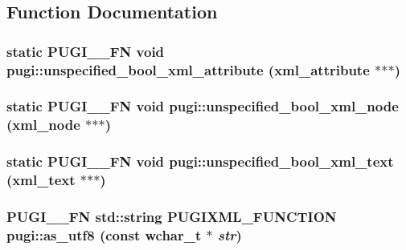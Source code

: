 \subsection{Function Documentation}
\hypertarget{namespacepugi_8effe3a6fc7cc9c1cf2550739dbdc438}{
\subsubsection[unspecified\_\-bool\_\-xml\_\-attribute]{\setlength{\rightskip}{0pt plus 5cm}static PUGI\_\-\_\-FN void pugi::unspecified\_\-bool\_\-xml\_\-attribute (xml\_\-attribute $\ast$$\ast$$\ast$)}}
\label{namespacepugi_8effe3a6fc7cc9c1cf2550739dbdc438}


\hypertarget{namespacepugi_487b2e720a3808d6fd5730d7c97bcdac}{
\subsubsection[unspecified\_\-bool\_\-xml\_\-node]{\setlength{\rightskip}{0pt plus 5cm}static PUGI\_\-\_\-FN void pugi::unspecified\_\-bool\_\-xml\_\-node (xml\_\-node $\ast$$\ast$$\ast$)}}
\label{namespacepugi_487b2e720a3808d6fd5730d7c97bcdac}


\hypertarget{namespacepugi_cfae514de3abac05ed155e531a401c15}{
\subsubsection[unspecified\_\-bool\_\-xml\_\-text]{\setlength{\rightskip}{0pt plus 5cm}static PUGI\_\-\_\-FN void pugi::unspecified\_\-bool\_\-xml\_\-text (xml\_\-text $\ast$$\ast$$\ast$)}}
\label{namespacepugi_cfae514de3abac05ed155e531a401c15}


\hypertarget{namespacepugi_390bb44f7ba92b1a8a4f9157799d2ca8}{
\subsubsection[as\_\-utf8]{\setlength{\rightskip}{0pt plus 5cm}PUGI\_\-\_\-FN std::string PUGIXML\_\-FUNCTION pugi::as\_\-utf8 (const wchar\_\-t $\ast$ {\em str})}}
\label{namespacepugi_390bb44f7ba92b1a8a4f9157799d2ca8}


